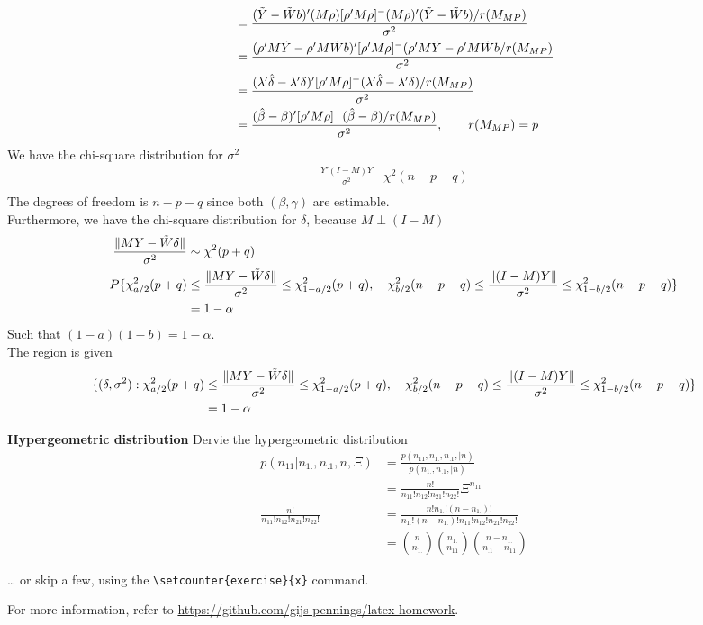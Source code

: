 \documentclass{homework}
\begin{document}
\begin{itemize}
\begin{align*}
 &= \frac{(\Tilde{Y}- \Tilde{W} b)' (M\rho) [\rho' M \rho]^{-} (M\rho)' (\Tilde{Y}- \Tilde{W} b)/r(M_{MP})}{\sigma^2} \\
 &= \frac{( \rho'M \Tilde{Y}- \rho'M \Tilde{W} b)'  [\rho' M \rho]^{-} ( \rho'M \Tilde{Y}-  \rho'M \Tilde{W} b/r(M_{MP})}{\sigma^2} \\
&=  \frac{(\lambda' \hat{\delta} - \lambda' \delta)'  [\rho' M \rho]^{-} (\lambda' \hat{\delta} - \lambda' \delta)/r(M_{MP})}{\sigma^2} \\
&=  \frac{(\hat{\beta} - \beta)'  [\rho' M \rho]^{-} (\hat{\beta} - \beta)/r(M_{MP})}{\sigma^2}, \qquad r(M_{MP}) = p
\end{align*}
We have the chi-square distribution for $\sigma^2$ 
\begin{align*}
\frac{Y'(I-M) Y}{\sigma^2} & \chi^2(n-p-q) \\
\end{align*}
The degrees of freedom is $n-p-q$ since both $(\beta, \gamma)$ are estimable. \\
Furthermore, we have the chi-square distribution for $\delta$, because $M \perp (I-M)$
\begin{align*}
\frac{ \lVert M Y - \Tilde{W} \delta \rVert}{\sigma^2} & \sim \chi^2(p+q) \\
P\{ \chi^2_{a/2}{(p+q)} &\leq \frac{\lVert MY - \Tilde{W} \delta  \rVert}{\sigma^2} \leq \chi^2_{1-a/2}{(p+q)}, \quad
\chi^2_{b/2}{(n-p-q)} \leq \frac{\lVert (I-M) Y \rVert}{\sigma^2} \leq \chi^2_{1-b/2}{(n-p-q)} \}\\
&= 1- \alpha
\end{align*}
Such that $(1-a)(1-b) = 1-\alpha$. \\
The region is given
\begin{align*}
\{(\delta, \sigma^2): \chi^2_{a/2}{(p+q)} &\leq \frac{\lVert MY -\Tilde{W} \delta \rVert}{\sigma^2} \leq \chi^2_{1-a/2}{(p+q)}, \quad
\chi^2_{b/2}{(n-p-q)} \leq \frac{\lVert (I-M) Y \rVert}{\sigma^2} \leq \chi^2_{1-b/2}{(n-p-q)} \}\\
&= 1- \alpha
\end{align*}
\end{itemize}

\exercise
\textbf{Hypergeometric distribution} Dervie the hypergeometric distribution \\
\begin{align*}
    p(n_{11}|n_{1.}, n_{.1}, n, \Xi) &=  \frac{p(n_{11}, n_{1.}, n_{.1}, |n)}{p( n_{1.}, n_{.1}, |n)} \\
    &= \frac{n!}{n_{11}!n_{12}!n_{21}!n_{22}!} \Xi^{n_{11}} \\
   \frac{n!}{n_{11}!n_{12}!n_{21}!n_{22}!} &=  \frac{n! n_{1.}! (n-n_{1.})!}{n_{1.}! (n-n_{1.})! n_{11}!n_{12}!n_{21}!n_{22}!} \\
    &= {n \choose n_{1.}} {n_{1.} \choose n_{11}} {n-n_{1.} \choose n_{.1}-n_{11}} 
\end{align*}

\setcounter{exercise}{7}
\exercise*
\dots{} or skip a few, using the \verb|\setcounter{exercise}{x}| command.

For more information, refer to \url{https://github.com/gijs-pennings/latex-homework}.
\end{document}
